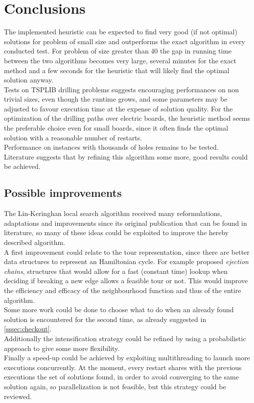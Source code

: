 \section{Conclusions}
\label{sec:conclusion}
The implemented heuristic can be expected to find very good (if not optimal) solutions for problem of small size and outperforms the exact algorithm in every conducted test. For problem of size greater than 40 the gap in running time between the two algorithms becomes very large, several minutes for the exact method and a few seconds for the heuristic that will likely find the optimal solution anyway.\\
Tests on TSPLIB drilling problems suggests encouraging performances on non trivial sizes, even though the runtime grows, and some parameters may be adjusted to favour execution time at the expense of solution quality.
For the optimization of the drilling paths over electric boards, the heuristic method seems the preferable choice even for small boards, since it often finds the optimal solution with a reasonable number of restarts. \\
Performance on instances with thousands of holes remains to be tested. Literature suggests that by refining this algorithm some more, good results could be achieved.
    
\subsection{Possible improvements}
The Lin-Keringhan local search algorithm received many reformulations, adaptations and improvements since its original publication that can be found in literature, so many of these ideas could be exploited to improve the hereby described algorithm.\\
A first improvement could relate to the tour representation, since there are better data structures to represent an Hamiltonian cycle. For example \cite{GLOVER1996223} proposed \textit{ejection chains}, structures that would allow for a fast (constant time) lookup when deciding if breaking a new edge allows a feasible tour or not. This would improve the efficiency and efficacy of the neighbourhood function and thus of the entire algorithm. \\
Some more work could be done to choose what to do when an already found solution is encountered for the second time, as already suggested in \cref{sssec:checkout}.\\ Additionally the intensification strategy could be refined by using a probabilistic approach to give some more flexibility.\\
Finally a speed-up could be achieved by exploiting multithreading to launch more executions concurrently. At the moment, every restart shares with the previous executions the set of solutions found, in order to avoid converging to the same solution again, so parallelization is not feasible, but this strategy could be reviewed.\\


